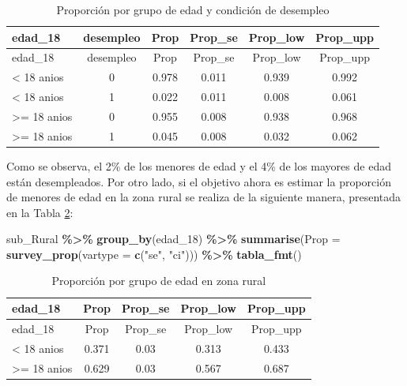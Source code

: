 \documentclass[
  spanish,
  12pt,
]{book}
\newenvironment{Shaded}{\begin{snugshade}}{\end{snugshade}}
\newcommand{\AttributeTok}[1]{\textcolor[rgb]{0.13,0.29,0.53}{#1}}
\newcommand{\FunctionTok}[1]{\textcolor[rgb]{0.13,0.29,0.53}{\textbf{#1}}}
\newcommand{\NormalTok}[1]{#1}
\newcommand{\SpecialCharTok}[1]{\textcolor[rgb]{0.81,0.36,0.00}{\textbf{#1}}}
\newcommand{\StringTok}[1]{\textcolor[rgb]{0.31,0.60,0.02}{#1}}
\begin{document}
\begin{longtable}[]{@{}lccccc@{}}
\caption{\label{tab:tab-prop-edad-desempleo}Proporción por grupo de edad y condición de desempleo}\tabularnewline
\toprule\noalign{}
edad\_18 & desempleo & Prop & Prop\_se & Prop\_low & Prop\_upp \\
\midrule\noalign{}
\endfirsthead
\toprule\noalign{}
edad\_18 & desempleo & Prop & Prop\_se & Prop\_low & Prop\_upp \\
\midrule\noalign{}
\endhead
\bottomrule\noalign{}
\endlastfoot
\textless{} 18 anios & 0 & 0.978 & 0.011 & 0.939 & 0.992 \\
\textless{} 18 anios & 1 & 0.022 & 0.011 & 0.008 & 0.061 \\
\textgreater= 18 anios & 0 & 0.955 & 0.008 & 0.938 & 0.968 \\
\textgreater= 18 anios & 1 & 0.045 & 0.008 & 0.032 & 0.062 \\
\end{longtable}

Como se observa, el 2\% de los menores de edad y el 4\% de los mayores de edad están desempleados. Por otro lado, si el objetivo ahora es estimar la proporción de menores de edad en la zona rural se realiza de la siguiente manera, presentada en la Tabla \ref{tab:tab-prop-edad-rural}:

\begin{Shaded}
\begin{Highlighting}[]
\NormalTok{sub\_Rural }\SpecialCharTok{\%\textgreater{}\%} 
  \FunctionTok{group\_by}\NormalTok{(edad\_18) }\SpecialCharTok{\%\textgreater{}\%} 
  \FunctionTok{summarise}\NormalTok{(}\AttributeTok{Prop =} \FunctionTok{survey\_prop}\NormalTok{(}\AttributeTok{vartype =}  \FunctionTok{c}\NormalTok{(}\StringTok{"se"}\NormalTok{, }\StringTok{"ci"}\NormalTok{))) }\SpecialCharTok{\%\textgreater{}\%}
  \FunctionTok{tabla\_fmt}\NormalTok{()}
\end{Highlighting}
\end{Shaded}

\begin{longtable}[]{@{}lcccc@{}}
\caption{\label{tab:tab-prop-edad-rural}Proporción por grupo de edad en zona rural}\tabularnewline
\toprule\noalign{}
edad\_18 & Prop & Prop\_se & Prop\_low & Prop\_upp \\
\midrule\noalign{}
\endfirsthead
\toprule\noalign{}
edad\_18 & Prop & Prop\_se & Prop\_low & Prop\_upp \\
\midrule\noalign{}
\endhead
\bottomrule\noalign{}
\endlastfoot
\textless{} 18 anios & 0.371 & 0.03 & 0.313 & 0.433 \\
\textgreater= 18 anios & 0.629 & 0.03 & 0.567 & 0.687 \\
\end{longtable}
\end{document}
